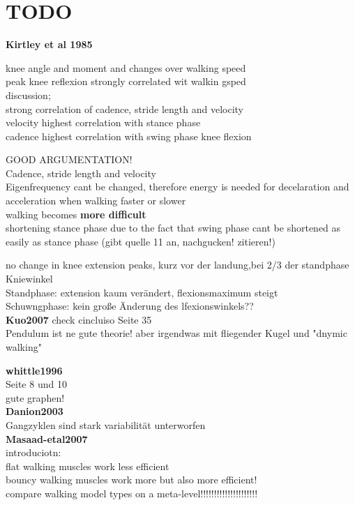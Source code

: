 \section{TODO}

\textbf{Kirtley et al 1985}

knee angle and moment and changes over walking speed\\
peak knee reflexion strongly correlated wit walkin gsped\\

discussion;\\
strong correlation of cadence, stride length and velocity\\
velocity highest correlation with stance phase\\
cadence highest correlation with swing phase knee flexion

GOOD ARGUMENTATION!\\
Cadence, stride length and velocity\\
Eigenfrequency cant be changed, therefore energy is needed for decelaration and acceleration when walking faster or slower\\
walking becomes \textbf{more difficult}\\

shortening stance phase due to the fact that swing phase cant be shortened as easily as stance phase (gibt quelle 11 an, nachgucken! zitieren!)

no change in knee extension peaks, kurz vor der landung,bei 2/3 der standphase\\

Kniewinkel\\
Standphase: extension kaum verändert, flexionsmaximum steigt\\
Schuwngphase: kein große Änderung des lfexionswinkels??\\

\textbf{Kuo2007}
check cincluiso Seite 35\\
Pendulum ist ne gute theorie! aber irgendwas mit fliegender Kugel und "dnymic walking"

\textbf{whittle1996}\\
Seite 8 und 10\\
gute graphen!\\

\textbf{Danion2003}\\
Gangzyklen sind stark variabilität unterworfen\\

\textbf{Masaad-etal2007}\\
introduciotn:\\
flat walking muscles work less efficient\\
bouncy walking muscles work more but also more efficient!\\
compare walking model types on a meta-level!!!!!!!!!!!!!!!!!!!!!\\


